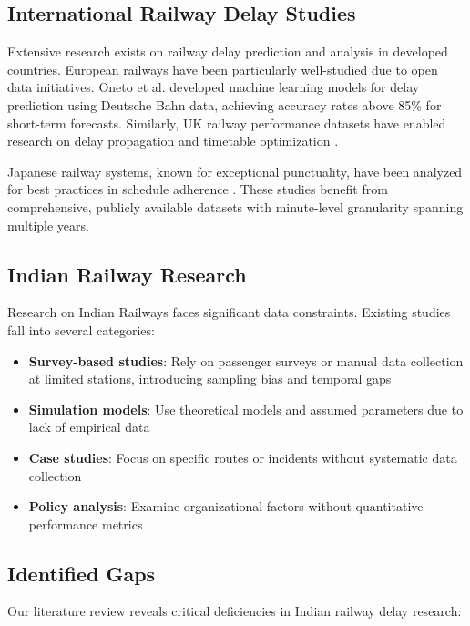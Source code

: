 \documentclass[11pt,a4paper]{article}
\begin{document}
\subsection{International Railway Delay Studies}

Extensive research exists on railway delay prediction and analysis in developed countries. European railways have been particularly well-studied due to open data initiatives. Oneto et al. \cite{oneto2018train} developed machine learning models for delay prediction using Deutsche Bahn data, achieving accuracy rates above 85\% for short-term forecasts. Similarly, UK railway performance datasets have enabled research on delay propagation \cite{flier2009delay} and timetable optimization \cite{goverde2010railway}.

Japanese railway systems, known for exceptional punctuality, have been analyzed for best practices in schedule adherence \cite{tomii2005train}. These studies benefit from comprehensive, publicly available datasets with minute-level granularity spanning multiple years.

\subsection{Indian Railway Research}

Research on Indian Railways faces significant data constraints. Existing studies fall into several categories:

\begin{itemize}
    \item \textbf{Survey-based studies}: Rely on passenger surveys or manual data collection at limited stations, introducing sampling bias and temporal gaps \cite{india_survey_example}
    \item \textbf{Simulation models}: Use theoretical models and assumed parameters due to lack of empirical data \cite{india_simulation_example}
    \item \textbf{Case studies}: Focus on specific routes or incidents without systematic data collection
    \item \textbf{Policy analysis}: Examine organizational factors without quantitative performance metrics
\end{itemize}

\subsection{Identified Gaps}

Our literature review reveals critical deficiencies in Indian railway delay research:
\end{document}
